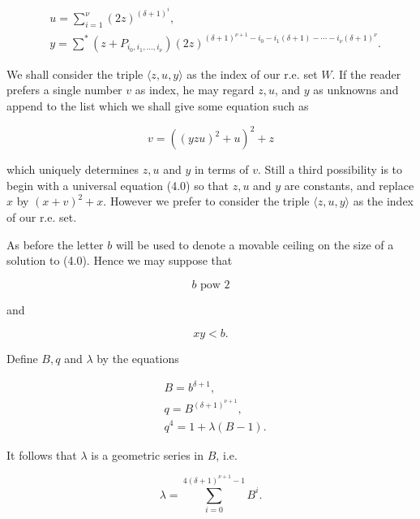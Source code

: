 \documentclass[11pt,a4paper]{article}
\begin{document}
\begin{align*}
& u=\sum_{i=1}^{\nu}(2 z)^{(\delta+1)^{i}},  \tag{4.1}\\
& y=\sum^{*}\left(z+P_{i_{0}, i_{1}, \ldots, i_{\nu}}\right)(2 z)^{(\delta+1)^{\nu+1}-i_{0}-i_{1}(\delta+1)-\cdots-i_{\nu}(\delta+1)^{\nu}} .
\end{align*}


We shall consider the triple $\langle z,\allowbreak  u,\allowbreak  y\rangle$ as the index of our r.e. set $W$. If the reader prefers a single number $v$ as index, he may regard $z,\allowbreak  u$, and $y$ as unknowns and append to the list which we shall give some equation such as


\begin{equation*}
v=\left((yzu)^{2}+u\right)^{2}+z \tag{U0}
\end{equation*}


which uniquely determines $z,\allowbreak  u$ and $y$ in terms of $v$. Still a third possibility is to begin with a universal equation (4.0) so that $z,\allowbreak  u$ and $y$ are constants, and replace $x$ by $(x+v)^{2}+x$. However we prefer to consider the triple $\langle z,\allowbreak  u,\allowbreak  y\rangle$ as the index of our r.e. set.

As before the letter $b$ will be used to denote a movable ceiling on the size of a solution to (4.0). Hence we may suppose that


\begin{equation*}
b \text { pow } 2 \tag{4.2}
\end{equation*}


and


\begin{equation*}
x y<b . \tag{U1}
\end{equation*}


Define $B,\allowbreak  q$ and $\lambda$ by the equations


\begin{align*}
& B=b^{\delta+1},  \tag{U2}\\
& q=B^{(\delta+1)^{\nu+1}},  \tag{U3}\\
& q^{4}=1+\lambda(B-1) . \tag{U4}
\end{align*}


It follows that $\lambda$ is a geometric series in $B$, i.e.


\begin{equation*}
\lambda=\sum_{i=0}^{4(\delta+1)^{\nu+1}-1} B^{i} . \tag{4.3}
\end{equation*}
\end{document}
